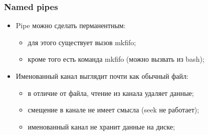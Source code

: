\begin{frame}
\frametitle{Named pipes}

\begin{itemize}
  \item<1-> Pipe можно сделать перманентным:
    \begin{itemize}
      \item для этого существует вызов mkfifo;
      \item кроме того есть команда mkfifo (можно вызвать из bash);
    \end{itemize}
  \item<2-> Именованный канал выглядит почти как обычный файл:
    \begin{itemize}
      \item в отличие от файла, чтение из канала удаляет данные;
      \item смещение в канале не имеет смысла (seek не работает);
      \item именованный канал не хранит данные на диске;
    \end{itemize}
\end{itemize}
\end{frame}
